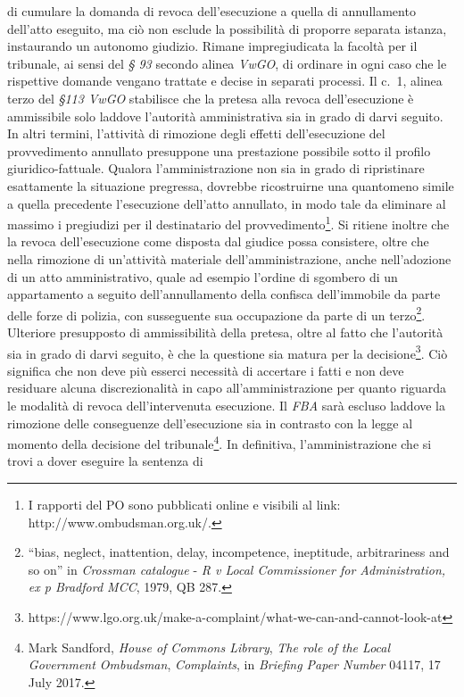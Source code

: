 \documentclass[12pt,it,a4paper,]{report}
\begin{document}
di cumulare la domanda di revoca dell'esecuzione a quella di
annullamento dell'atto eseguito, ma ciò non esclude la possibilità di
proporre separata istanza, instaurando un autonomo giudizio. Rimane
impregiudicata la facoltà per il tribunale, ai sensi del \emph{§ 93}
secondo alinea \emph{VwGO}, di ordinare in ogni caso che le rispettive
domande vengano trattate e decise in separati processi. Il c.~1, alinea
terzo del \emph{§113 VwGO} stabilisce che la pretesa alla revoca
dell'esecuzione è ammissibile solo laddove l'autorità amministrativa sia
in grado di darvi seguito. In altri termini, l'attività di rimozione
degli effetti dell'esecuzione del provvedimento annullato presuppone una
prestazione possibile sotto il profilo giuridico-fattuale. Qualora
l'amministrazione non sia in grado di ripristinare esattamente la
situazione pregressa, dovrebbe ricostruirne una quantomeno simile a
quella precedente l'esecuzione dell'atto annullato, in modo tale da
eliminare al massimo i pregiudizi per il destinatario del
provvedimento\footnote{I rapporti del PO sono pubblicati online e
  visibili al link: http://www.ombudsman.org.uk/.}. Si ritiene inoltre
che la revoca dell'esecuzione come disposta dal giudice possa
consistere, oltre che nella rimozione di un'attività materiale
dell'amministrazione, anche nell'adozione di un atto amministrativo,
quale ad esempio l'ordine di sgombero di un appartamento a seguito
dell'annullamento della confisca dell'immobile da parte delle forze di
polizia, con susseguente sua occupazione da parte di un
terzo\footnote{``bias, neglect, inattention, delay, incompetence,
  ineptitude, arbitrariness and so on'' in \emph{Crossman catalogue} -
  \emph{R v Local Commissioner for Administration, ex p Bradford MCC},
  1979, QB 287.}. Ulteriore presupposto di ammissibilità della pretesa,
oltre al fatto che l'autorità sia in grado di darvi seguito, è che la
questione sia matura per la decisione\footnote{https://www.lgo.org.uk/make-a-complaint/what-we-can-and-cannot-look-at}.
Ciò significa che non deve più esserci necessità di accertare i fatti e
non deve residuare alcuna discrezionalità in capo all'amministrazione
per quanto riguarda le modalità di revoca dell'intervenuta esecuzione.
Il \emph{FBA} sarà escluso laddove la rimozione delle conseguenze
dell'esecuzione sia in contrasto con la legge al momento della decisione
del tribunale\footnote{Mark Sandford, \emph{House of Commons Library},
  \emph{The role of the Local Government Ombudsman}, \emph{Complaints},
  in \emph{Briefing Paper Number} 04117, 17 July 2017.}. In definitiva,
l'amministrazione che si trovi a dover eseguire la sentenza di
\end{document}
